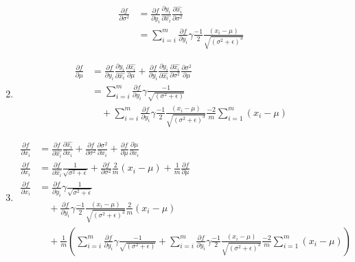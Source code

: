 \documentclass{article}
\begin{document}
\begin{enumerate}[label=\alph*.]
\begin{equation*}
\begin{aligned}
            \frac{\partial f}{\partial \sigma^2} &= \frac{\partial f}{\partial y_i} \frac{\partial y_i}{\partial \widehat{x_i}} \frac{\partial \widehat{x_i}}{\partial \sigma^2} \\
            &=  \sum_{i=i}^{m}\frac{\partial f}{\partial y_i} \gamma \frac{-1}{2} \frac{(x_i-\mu)}{\sqrt{(\sigma^2 + \epsilon)^3}}
        \end{aligned}
    \end{equation*}  
    \item 
    \begin{equation*}
        \begin{aligned}
            \frac{\partial f}{\partial \mu} &= \frac{\partial f}{\partial y_i} \frac{\partial y_i}{\partial \widehat{x_i}} \frac{\partial \widehat{x_i}}{\partial \mu} + \frac{\partial f}{\partial y_i} \frac{\partial y_i}{\partial \widehat{x_i}} \frac{\partial \widehat{x_i}}{\partial \sigma^2} \frac{\partial \sigma^2}{\partial \mu} \\
            &= \sum_{i=i}^{m}\frac{\partial f}{\partial y_i} \gamma \frac{-1}{\sqrt{(\sigma^2+\epsilon)}} \\
            &\quad+ \sum_{i=i}^{m}\frac{\partial f}{\partial y_i} \gamma \frac{-1}{2} \frac{(x_i-\mu)}{\sqrt{(\sigma^2 + \epsilon)^3}} \frac{-2}{m} \sum_{i=1}^{m}(x_i - \mu) 
        \end{aligned}
    \end{equation*}  
    \item
    \begin{equation*}
        \begin{aligned}
            \frac{\partial f}{\partial x_i} &= \frac{\partial f}{\partial \widehat{x_i}} \frac{\partial \widehat{x_i}}{\partial x_i} + \frac{\partial f}{\partial \sigma^2} \frac{\partial \sigma^2}{\partial x_i} + \frac{\partial f}{\partial \mu} \frac{\partial \mu}{\partial x_i} \\
            \frac{\partial f}{\partial x_i} &= \frac{\partial f}{\partial \widehat{x_i}}\frac{1}{\sqrt{\sigma^2+\epsilon}} + \frac{\partial f}{\partial \sigma^2}\frac{2}{m}(x_i-\mu) + \frac{1}{m}\frac{\partial f}{\partial \mu}\\
            \frac{\partial f}{\partial x_i} &= \frac{\partial f}{\partial y_i} \gamma \frac{1}{\sqrt{\sigma^2+\epsilon}} \\
            &\quad+ \frac{\partial f}{\partial y_i} \gamma \frac{-1}{2} \frac{(x_i-\mu)}{\sqrt{(\sigma^2 + \epsilon)^3}} \frac{2}{m}(x_i-\mu) \\
            &\quad+ \frac{1}{m}(\sum_{i=i}^{m}\frac{\partial f}{\partial y_i} \gamma \frac{-1}{\sqrt{(\sigma^2+\epsilon)}} 
            + \sum_{i=i}^{m}\frac{\partial f}{\partial y_i} \gamma \frac{-1}{2} \frac{(x_i-\mu)}{\sqrt{(\sigma^2 + \epsilon)^3}} \frac{-2}{m} \sum_{i=1}^{m}(x_i - \mu) )
        \end{aligned}
    \end{equation*}
\end{enumerate}
\end{document}
